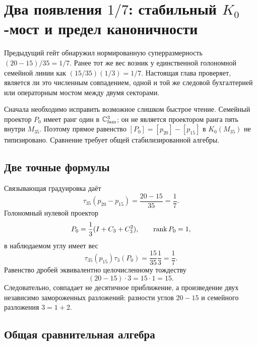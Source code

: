 \chapter{Два появления \texorpdfstring{$1/7$}{1/7}: стабильный \texorpdfstring{$K_0$}{K0}-мост и предел каноничности}

Предыдущий гейт обнаружил нормированную суперразмерность
$(20-15)/35=1/7$. Ранее тот же вес возник у единственной голономной
семейной линии как $(15/35)(1/3)=1/7$. Настоящая глава проверяет, является
ли это численным совпадением, одной и той же следовой бухгалтерией или
операторным мостом между двумя секторами.

Сначала необходимо исправить возможное слишком быстрое чтение. Семейный
проектор $P_0$ имеет ранг один в $\mathbb C^3_{\rm fam}$; он не является
проектором ранга пять внутри $M_{35}$. Поэтому прямое равенство
$[P_0]=[p_{20}]-[p_{15}]$ в $K_0(M_{35})$ не типизировано. Сравнение
требует общей стабилизированной алгебры.

\section{Две точные формулы}

Связывающая градуировка даёт
\begin{equation}
 \tau_{35}(p_{20}-p_{15})
 =\frac{20-15}{35}=\frac17.
 \label{eq:v5-one-seventh-corner}
\end{equation}
Голономный нулевой проектор
\begin{equation}
 P_0=\frac13(I+C_3+C_3^2),
 \qquad \operatorname{rank} P_0=1,
\end{equation}
в наблюдаемом углу имеет вес
\begin{equation}
 \tau_{35}(p_{15})\tau_3(P_0)
 =\frac{15}{35}\frac13=\frac17.
 \label{eq:v5-one-seventh-holonomy}
\end{equation}
Равенство дробей эквивалентно целочисленному тождеству
\begin{equation}
 (20-15)\cdot3=15\cdot1=15.
 \label{eq:v5-one-seventh-rank-duality}
\end{equation}
Следовательно, совпадает не десятичное приближение, а произведение двух
независимо замороженных разложений: разности углов $20-15$ и семейного
разложения $3=1+2$.

\section{Общая сравнительная алгебра}

